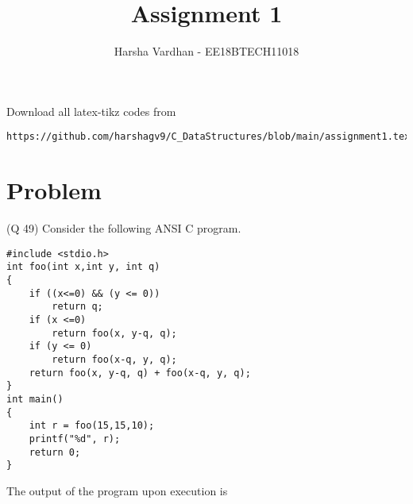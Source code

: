 \documentclass[journal,12pt,twocolumn]{IEEEtran}
\begin{document}
     \def\rightbox#1{\makebox[0in][r]{#1}}
     \def\centbox#1{\makebox[0in]{#1}}
     \def\topbox#1{\raisebox{-\baselineskip}[0in][0in]{#1}}
     \def\midbox#1{\raisebox{-0.5\baselineskip}[0in][0in]{#1}}
\vspace{3cm}
\title{Assignment 1}
\author{Harsha Vardhan - EE18BTECH11018}
\maketitle
\newpage
\bigskip
\renewcommand{\thefigure}{\theenumi}
\renewcommand{\thetable}{\theenumi}
Download all latex-tikz codes from 
%
\begin{lstlisting}
https://github.com/harshagv9/C_DataStructures/blob/main/assignment1.tex
\end{lstlisting}
\section{Problem}
(Q 49) Consider the following ANSI C program.
\begin{lstlisting}
#include <stdio.h>
int foo(int x,int y, int q)
{
    if ((x<=0) && (y <= 0)) 
        return q;
    if (x <=0)
        return foo(x, y-q, q);
    if (y <= 0)
        return foo(x-q, y, q);
    return foo(x, y-q, q) + foo(x-q, y, q);
}
int main()
{
    int r = foo(15,15,10);
    printf("%d", r);
    return 0;
}
\end{lstlisting}
The output of the program upon execution is 
\end{document}
